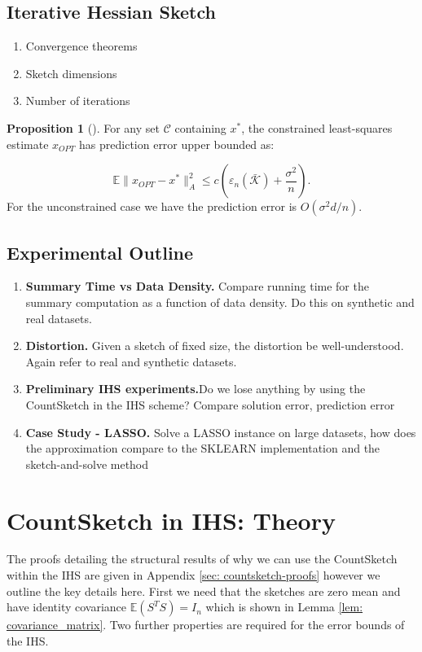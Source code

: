 \documentclass[twoside]{article}
\newcommand{\E}{\mathbb{E}}
\newcommand{\eps}{\varepsilon}
\theoremstyle{definition}\newtheorem{thm}{Theorem}[section]
\theoremstyle{definition}\newtheorem{mydef}[thm]{Definition}
\theoremstyle{definition}\newtheorem{rem}[thm]{Remark}
\theoremstyle{definition}\newtheorem{prop}[thm]{Proposition}
\theoremstyle{definition}\newtheorem{example}[thm]{Example}
\theoremstyle{definition}\newtheorem{claim}[thm]{Claim}
\theoremstyle{definition}\newtheorem{Qu}[thm]{Question}
\theoremstyle{definition}\newtheorem{Lemma}[thm]{Lemma}
\theoremstyle{definition}\newtheorem{Cor}[thm]{Corollary}
\theoremstyle{definition}\newtheorem{Fact}[]{Fact}
\begin{document}
\subsection{Iterative Hessian Sketch}
\begin{enumerate}
  \item{Convergence theorems}
  \item{Sketch dimensions}
  \item{Number of iterations}
\end{enumerate}

\begin{prop}[\cite{pilanci2016iterative}] \label{prop: ihs-error-bound}
  For any set $\mathcal{C}$ containing $x^*$, the constrained least-squares
  estimate $x_{OPT}$ has prediction error upper bounded as:

  \begin{equation}
    \E \|x_{OPT} - x^* \|_A^2 \le c \left(\eps_n(\mathcal{\bar{K}}) +
    \frac{\sigma^2}{n}\right).
  \end{equation}
  For the unconstrained case we have the prediction error is $O(\sigma^2 d/n)$.
\end{prop}



\subsection{Experimental Outline}

\begin{enumerate}
  \item{\textbf{Summary Time vs Data Density.}  Compare running time for the
  summary computation as a function of data density.
  Do this on synthetic and real datasets.}
  \item{\textbf{Distortion.}  Given a sketch of fixed size, the distortion be
  well-understood.  Again refer to real and synthetic datasets.}
  \item{\textbf{Preliminary IHS experiments.}Do we lose anything by using the
  CountSketch in the IHS scheme? Compare solution error, prediction error}
  \item{\textbf{Case Study - LASSO.} Solve a LASSO
  instance on large datasets, how does the approximation compare to the SKLEARN
  implementation and the sketch-and-solve method}
\end{enumerate}

\section{CountSketch in IHS: Theory}
The proofs detailing the structural results of why we can use the CountSketch
within the IHS are given in Appendix \ref{sec: countsketch-proofs} however we
outline the key details here.
First we need that the sketches are zero mean and have identity covariance
$\E(S^TS) = I_{n}$ which is shown in Lemma \ref{lem: covariance_matrix}.
Two further properties are required for the error bounds of the IHS.
\end{document}
